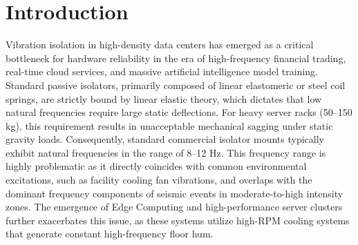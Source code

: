 \documentclass[preprint,12pt]{article}
\begin{document}
\begin{abstract}
The seismic protection of high-density server infrastructure represents a critical challenge in modern data center engineering, where traditional linear isolation systems often fail due to the inherent trade-off between static load capacity and low-frequency isolation efficiency. This paper presents a rigorous analytical and numerical investigation into a Quasi-Zero-Stiffness (QZS) isolator mechanism, based on the non-linear multi-spring topology proposed by Carrella et al. (2007). We derive the high-static-low-dynamic stiffness (HSLDS) characteristic through the geometric superposition of negative stiffness oblique elements and a positive stiffness vertical foundation. Beyond theoretical reproduction, this study extends the Carrella framework to a mass-invariant engineering solution for 100 kg server racks under IS 1893:2016 Zone III seismic loading. The mass-invariant property---whereby $f_n = \sqrt{g \hat{K} / \delta_{static}}$ is independent of payload mass---is analytically proven following Wang et al. (2020) \cite{wang2018mass}. Numerical results confirm that the QZS configuration achieves a mass-independent natural frequency of 0.5 Hz, suppressing peak spectral accelerations by over 90\% and maintaining structural response well below the 0.5g equipment damage threshold. The study concludes with a pedagogical roadmap for physical realization using Belleville washer stacks and real-time transient verification.
\end{abstract}

\section{Introduction}
Vibration isolation in high-density data centers has emerged as a critical bottleneck for hardware reliability in the era of high-frequency financial trading, real-time cloud services, and massive artificial intelligence model training. Standard passive isolators, primarily composed of linear elastomeric or steel coil springs, are strictly bound by linear elastic theory, which dictates that low natural frequencies require large static deflections. For heavy server racks (50--150 kg), this requirement results in unacceptable mechanical sagging under static gravity loads. Consequently, standard commercial isolator mounts typically exhibit natural frequencies in the range of 8--12 Hz. This frequency range is highly problematic as it directly coincides with common environmental excitations, such as facility cooling fan vibrations, and overlaps with the dominant frequency components of seismic events in moderate-to-high intensity zones. The emergence of Edge Computing and high-performance server clusters further exacerbates this issue, as these systems utilize high-RPM cooling systems that generate constant high-frequency floor hum.
\end{document}
